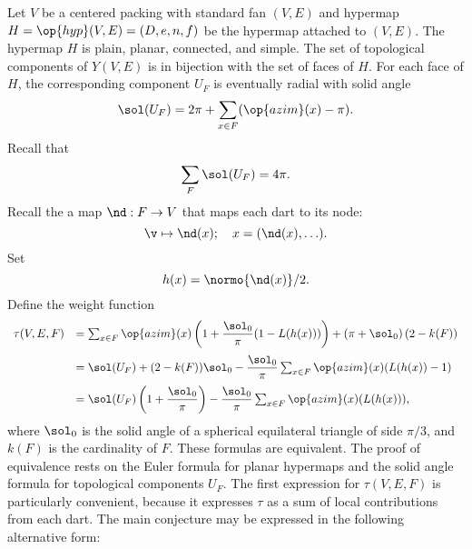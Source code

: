 Let $V$ be a centered packing with
standard fan $(V,E)$ and hypermap $H=\op{hyp}(V,E)=(D,e,n,f)$
be the hypermap attached to $(V,E)$.
The hypermap $H$ is plain, planar, connected, and simple.
The set of topological components of $Y(V,E)$ is in bijection with
the set of faces of $H$.  
%
For each face of $H$, the corresponding component $U_F$
is eventually radial with solid
angle
%
\begin{displaymath}
\sol(U_F) = 2\pi + \sum_{x\in F} (\op{azim}(x) -\pi).
\end{displaymath}
Recall that
\begin{displaymath}\sum_{F} \sol(U_F) = 4\pi.\end{displaymath}
Recall the a map $\nd:F\to V$ that maps each dart to its node:
\begin{displaymath}
\v \mapsto \nd(x); \quad   x = (\nd(x),\ldots).
\end{displaymath}
Set 
\begin{displaymath}h(x) = \normo{\nd(x)}/2.\end{displaymath}
Define the weight function
\begin{equation}
\begin{array}{lll}
  \tau(V,E,F) &=\sum_{x\in F} \op{azim}(x)
  \left(1 + \dfrac{\sol_0}{\pi}(1- L(h(x)))\right) 
  + \left(\pi+{\sol_0}\right) (2- k(F))\vspace{6pt}\\
  &= \sol(U_F) + (2- k(F))\sol_0 - \dfrac{\sol_0}{\pi}
\sum_{x\in F}\op{azim}(x) (L(h(x)) - 1)\vspace{6pt}\\
  &= \sol(U_F) \left( 1 + \dfrac{\sol_0}{\pi}\right) 
- \dfrac{\sol_0}{\pi} \sum_{x\in F} \op{azim}(x)(L(h(x))),\\
\end{array}
\end{equation}
where $\sol_0$ is the solid angle of a spherical equilateral triangle
of side $\pi/3$, and $k(F)$ is the cardinality of $F$.
% 
These formulas are equivalent.  The proof of equivalence rests on the
Euler formula for planar hypermaps and the solid angle formula for
topological components $U_F$.  The first expression for $\tau(V,E,F)$
is particularly convenient, because it expresses $\tau$ as a sum of
local contributions from each dart.  %
%
%
The main conjecture may be expressed in the following alternative
form:

